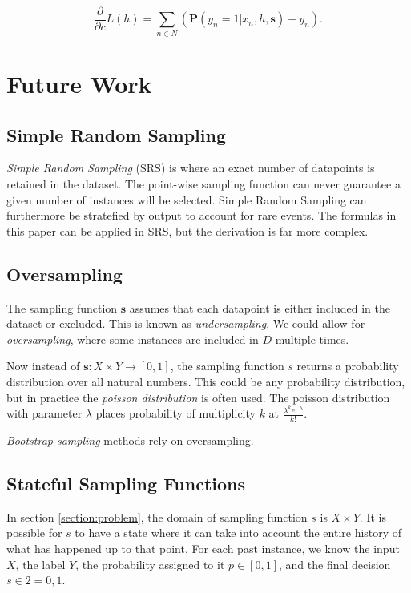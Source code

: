 \documentclass[twoside]{article}
\begin{document}
\[\frac{\partial}{\partial c}L(h)=\sum_{n \in  N} \left(\mathbf{P}(y_n=1|x_n,h,\mathbf{s})  -y_n\right ).\]

\section{Future Work}
\label{section:future_work}

\subsection{Simple Random Sampling}

\textit{Simple Random Sampling} (SRS) is where an exact number of datapoints is retained in the dataset. The point-wise sampling function can never guarantee a given number of instances will be selected. Simple Random Sampling can furthermore be stratefied by output to account for rare events. The formulas in this paper can be applied in SRS, but the derivation is far more complex.

\subsection{Oversampling}

The sampling function \(\mathbf{s}\) assumes that each datapoint is either included in the dataset or excluded. This is known as \textit{undersampling}. We could allow for \textit{oversampling}, where some instances are included in \(D\) multiple times.

Now instead of \(\mathbf{s}: X \times Y \rightarrow \left [ 0, 1\right ]\), the sampling function \(s\) returns a probability distribution over all natural numbers. This could be any probability distribution, but in practice the \textit{poisson distribution} is often used. The poisson distribution with parameter \(\lambda\) places probability of multiplicity \(k\) at \(\frac{\lambda^k e^{-\lambda}}{k!}\).

\textit{Bootstrap sampling} methods rely on oversampling.

\subsection{Stateful Sampling Functions}
In section \ref{section:problem}, the domain of sampling function \(s\) is \(X \times Y\). It is possible for \(s\) to have a state where it can take into account the entire history of what has happened up to that point. For each past instance, we know the input \(X\), the label \(Y\), the probability assigned to it \(p \in \left [ 0, 1\right ]\), and the final decision \(s \in 2 = {0, 1}\).
\end{document}
